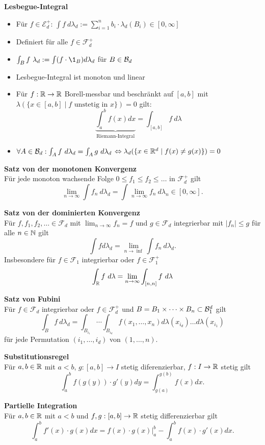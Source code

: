 \textbf{Lesbegue-Integral}
\begin{itemize}
\item Für $f\in\mathcal{E}_d^+$: 
$\int f~d\lambda_d:=\sum_{i=1}^{n} b_i\cdot\lambda_d(B_i)\in [0,\infty]$

\item Definiert für alle $f\in\mathcal{F}_d^+$

\item $\int_B f~\lambda_d:=\int (f\cdot \1_B)d\lambda_d$ für $B\in\mathcal{B}_{d}$

\item Lesbegue-Integral ist monoton und linear

\item Für $f:\mathbb{R}\to\mathbb{R}$ Borell-messbar und beschränkt auf $[a,b]$ mit
\mbox{$\lambda(\{x\in[a,b]\mid f \text{ unstetig in }x\})=0$} gilt:
\[
	\underbrace{\int_{a}^{b}f(x)dx}_{\text{Riemann-Integral}}
	= \int_{[a,b]} f~d\lambda
\]

\item $\forall A\in\mathcal{B}_{d}:\int_A f~d\lambda_d = \int_A g~d\lambda_d$
$\Leftrightarrow \lambda_d(\{x\in\mathbb{R}^d\mid f(x)\neq g(x)\})=0$
\end{itemize}

\textbf{Satz von der monotonen Konvergenz}\\
Für jede monoton wachsende Folge $0\leq f_1\leq f_2\leq\ldots$
in $\mathcal{F}_d^+$ gilt
\[\lim_{n\to\infty}\int f_n~d\lambda_d=
\int\lim_{n\to\infty} f_n~d\lambda_n\in [0,\infty].\]

\textbf{Satz von der dominierten Konvergenz}\\
Für $f,f_1,f_2,\ldots\in\mathcal{F}_d$ mit $\lim_{n\to\infty} f_n=f$ 
und $g\in\mathcal{F}_d$ integrierbar mit $|f_n|\leq g$ für alle $n\in\mathbb{N}$ gilt
\[
	\int fd\lambda_d=\lim_{n\to\inf} \int f_n~d\lambda_d.
\]
Insbesondere für $f\in\mathcal{F}_1$ integrierbar oder $f\in\mathcal{F}_1^+$
\[
	\int_{\mathbb{R}} f~d\lambda=\lim_{n\to\infty} \int_{[n,n]} f~d\lambda
\]


\textbf{Satz von Fubini}\\
Für $f\in\mathcal{F}_d$ integrierbar oder $f\in\mathcal{F}_d^+$ und
$B = B_1\times\cdots\times B_n\subset\mathcal{B}_{1}^d$ gilt
\[
	\int_B f~d\lambda_d=\int_{B_{i_1}}\cdots\int_{B_{i_d}} f(x_1,\ldots,x_n)
	d\lambda(x_{i_d})\ldots d\lambda(x_{i_1})
\]
für jede Permutation $(i_1,\ldots,i_d)$ von $(1,\ldots,n)$.

\textbf{Substitutionsregel}\\
Für $a,b\in\mathbb{R}$ mit $a<b$, $g:[a,b]\to I$ stetig diferenzierbar, $f:I\to\mathbb{R}$ stetig gilt
\[
	\int_a^b f(g(y))\cdot g'(y)dy=\int_{g(a)}^{g(b)}f(x)dx.
\]

\textbf{Partielle Integration}\\
Für $a,b\in\mathbb{R}$ mit $a<b$ und $f,g:[a,b]\to\mathbb{R}$ stetig differenzierbar gilt
\[
	\int_a^b f'(x)\cdot g(x)dx 
	= f(x)\cdot g(x)\Big\vert_a^b-\int_a^b f(x)\cdot g'(x)dx.
\]
